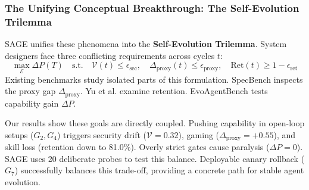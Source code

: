 \subsubsection{The Unifying Conceptual Breakthrough: The Self-Evolution Trilemma}
SAGE unifies these phenomena into the \textbf{Self-Evolution Trilemma}. System designers face three conflicting requirements across cycles $t$:
\begin{equation}
\max_{\mathcal{E}} \Delta P(T) \quad \text{s.t.} \quad \mathcal{V}(t) \le \epsilon_{\text{sec}}, \quad \Delta_{\text{proxy}}(t) \le \epsilon_{\text{proxy}}, \quad \text{Ret}(t) \ge 1 - \epsilon_{\text{ret}}
\end{equation}
Existing benchmarks study isolated parts of this formulation. SpecBench inspects the proxy gap $\Delta_{\text{proxy}}$. Yu et al. examine retention. EvoAgentBench tests capability gain $\Delta P$.

Our results show these goals are directly coupled. Pushing capability in open-loop setups ($G_2, G_4$) triggers security drift ($\mathcal{V} = 0.32$), gaming ($\Delta_{\text{proxy}} = +0.55$), and skill loss (retention down to 81.0\%). Overly strict gates cause paralysis ($\Delta P = 0$). SAGE uses 20 deliberate probes to test this balance. Deployable canary rollback ($G_7$) successfully balances this trade-off, providing a concrete path for stable agent evolution.
